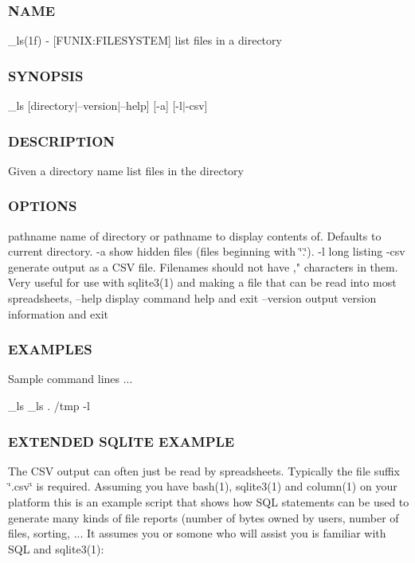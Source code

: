 \subsubsection*{N\+A\+ME}

\+\_\+ls(1f) -\/ \mbox{[}F\+U\+N\+IX\+:F\+I\+L\+E\+S\+Y\+S\+T\+EM\mbox{]} list files in a directory \subsubsection*{S\+Y\+N\+O\+P\+S\+IS}

\+\_\+ls \mbox{[}directory$\vert$--version$\vert$--help\mbox{]} \mbox{[}-\/a\mbox{]} \mbox{[}-\/l$\vert$-\/csv\mbox{]} \subsubsection*{D\+E\+S\+C\+R\+I\+P\+T\+I\+ON}

Given a directory name list files in the directory \subsubsection*{O\+P\+T\+I\+O\+NS}

pathname name of directory or pathname to display contents of. Defaults to current directory. -\/a show hidden files (files beginning with \char`\"{}.\char`\"{}). -\/l long listing -\/csv generate output as a C\+SV file. Filenames should not have ,"\textquotesingle{} characters in them. Very useful for use with sqlite3(1) and making a file that can be read into most spreadsheets, --help display command help and exit --version output version information and exit \subsubsection*{E\+X\+A\+M\+P\+L\+ES}

Sample command lines ... \begin{DoxyVerb}   _ls
   _ls . /tmp -l
\end{DoxyVerb}


\subsubsection*{E\+X\+T\+E\+N\+D\+ED S\+Q\+L\+I\+TE E\+X\+A\+M\+P\+LE}

The C\+SV output can often just be read by spreadsheets. Typically the file suffix \char`\"{}.\+csv\char`\"{} is required. Assuming you have bash(1), sqlite3(1) and column(1) on your platform this is an example script that shows how S\+QL statements can be used to generate many kinds of file reports (number of bytes owned by users, number of files, sorting, ... It assumes you or somone who will assist you is familiar with S\+QL and sqlite3(1)\+:

